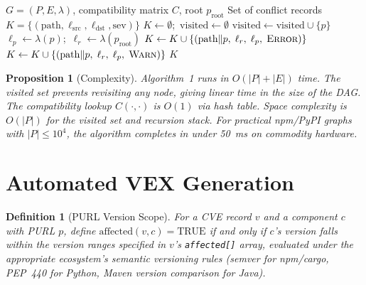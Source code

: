 \documentclass[11pt,twocolumn]{article}
\newtheorem{definition}{Definition}
\newtheorem{proposition}{Proposition}
\begin{document}
\begin{algorithm}[H]
\caption{License Conflict Propagation (LCP)}
\begin{algorithmic}[1]
\Require $G = (P, E, \lambda)$, compatibility matrix $C$, root $p_\mathrm{root}$
\Ensure Set of conflict records $K = \{(\mathrm{path}, \ell_\mathrm{src}, \ell_\mathrm{dst}, \mathrm{sev})\}$
\State $K \gets \emptyset$;\ $\mathrm{visited} \gets \emptyset$
   \Return \EndIf
  \State $\mathrm{visited} \gets \mathrm{visited} \cup \{p\}$
  \State $\ell_p \gets \lambda(p)$;\ $\ell_r \gets \lambda(p_\mathrm{root})$
    \State $K \gets K \cup \{(\mathrm{path} \| p,\; \ell_r,\; \ell_p,\; \textsc{Error})\}$
    \State $K \gets K \cup \{(\mathrm{path} \| p,\; \ell_r,\; \ell_p,\; \textsc{Warn})\}$
  \EndIf
    \State {}
  \EndFor
\EndFunction
\State {}
\State \Return $K$
\end{algorithmic}
\end{algorithm}

\begin{proposition}[Complexity]
Algorithm~1 runs in $O(|P| + |E|)$ time. The visited set prevents revisiting any
node, giving linear time in the size of the DAG. The compatibility lookup
$C(\cdot,\cdot)$ is $O(1)$ via hash table. Space complexity is $O(|P|)$ for the
visited set and recursion stack. For practical npm/PyPI graphs with
$|P| \le 10^4$, the algorithm completes in under 50~ms on commodity hardware.
\end{proposition}

\section{Automated VEX Generation}

\begin{definition}[PURL Version Scope]
For a CVE record $v$ and a component $c$ with PURL $p$, define
$\mathrm{affected}(v, c) = \mathrm{TRUE}$ if and only if $c$'s version falls
within the version ranges specified in $v$'s \texttt{affected[]} array, evaluated
under the appropriate ecosystem's semantic versioning rules (semver for npm/cargo,
PEP~440 for Python, Maven version comparison for Java).
\end{definition}
\end{document}
